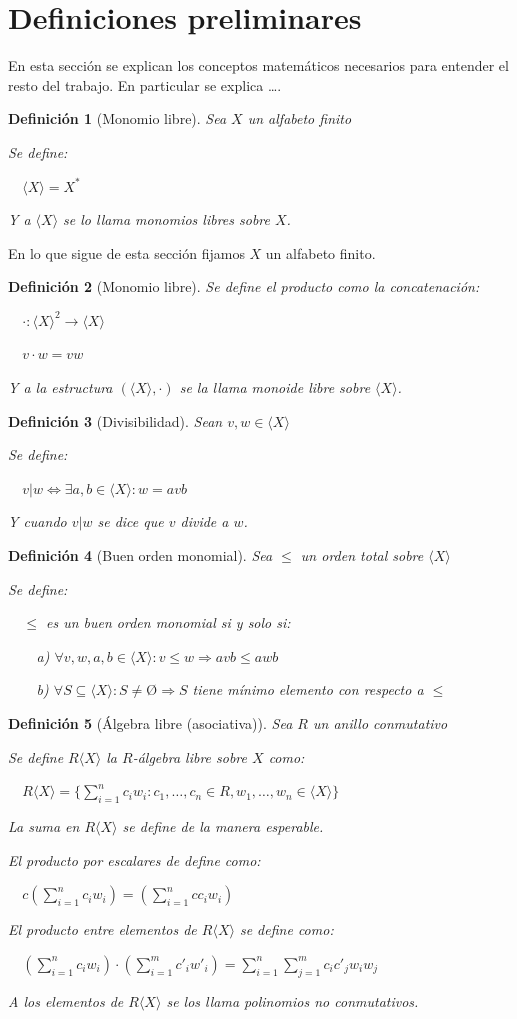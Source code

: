 \documentclass{amsbook}
\theoremstyle{customstyle}
\newtheorem{definition}{Definición}[section]
\newcommand{\definición}[2][]{
  \begin{definition}[#1]
  \setlength{\parindent}{2em} %
  #2
  \end{definition}
}
\begin{document}
\fontsize{16pt}{19pt}\selectfont %


\section{Definiciones preliminares}

En esta sección se explican los conceptos matemáticos necesarios para entender el resto del trabajo.
En particular se explica …. %


\definición[Monomio libre] {
Sea $X$ un alfabeto finito

Se define:

  $⟨X⟩ = X^*$

Y a $⟨X⟩$ se lo llama monomios libres sobre $X$.
}

En lo que sigue de esta sección fijamos $X$ un alfabeto finito.

\definición[Monomio libre] {
Se define el producto como la concatenación:

  $· : ⟨X⟩^2 → ⟨X⟩$

  $v · w = vw$

Y a la estructura $(⟨X⟩, ·)$ se la llama monoide libre sobre $⟨X⟩$.
}

\definición[Divisibilidad] {
Sean $v, w ∈ ⟨X⟩$

Se define:

  $v | w ⇔ ∃a , b ∈ ⟨X⟩ : w = avb$

Y cuando $v | w$ se dice que $v$ divide a $w$.
}

\definición[Buen orden monomial] {
Sea $≤$ un orden total sobre $⟨X⟩$

Se define:

  $≤$ es un buen orden monomial si y solo si:

    a) $∀v, w, a, b ∈ ⟨X⟩ : v ≤ w ⇒ avb ≤ awb$

    b) $∀S ⊆ ⟨X⟩ : S ≠ Ø ⇒ S$ tiene mínimo elemento con respecto a $≤$
}

\definición[Álgebra libre (asociativa)] {
Sea $R$ un anillo conmutativo

Se define $R⟨X⟩$ la $R$-álgebra libre sobre $X$ como:

  $R⟨X⟩ = \{\sum_{i = 1}^n c_i w_i : c_1, …, c_n ∈ R, w_1, …, w_n ∈ ⟨X⟩\}$

La suma en $R⟨X⟩$ se define de la manera esperable.

El producto por escalares de define como:

  $c (\sum_{i = 1}^n c_i w_i) = (\sum_{i = 1}^n c c_i w_i)$

El producto entre elementos de $R⟨X⟩$ se define como:

  $(\sum_{i = 1}^n c_i w_i) · (\sum_{i = 1}^m c'_i w'_i) = \sum_{i = 1}^n \sum_{j = 1}^m c_i c'_j w_i w_j$

A los elementos de $R⟨X⟩$ se los llama polinomios no conmutativos.
}
\end{document}
